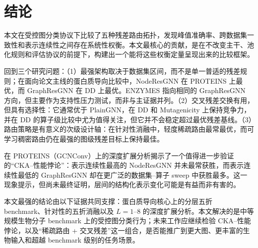 \section{结论}
\label{sec:conclusion}

本文在受控图分类协议下比较了五种残差路由拓扑，发现峰值准确率、跨数据集一致性和表示连续性之间存在系统性权衡。本文最核心的贡献，是在不改变主干、池化规则和评估协议的前提下，构建出一个能将这些权衡定量呈现出来的比较框架。

回到三个研究问题：（1）最强架构取决于数据集区间，而不是单一普适的残差规则；在面向论文主线的蛋白质导向比较中，NodeResGNN 在 PROTEINS 上最优，而 GraphResGNN 在 DD 上最优。ENZYMES 指向相同的 GraphResGNN 方向，但主要作为支持性压力测试，而非与主证据并列。（2）交叉残差交换有用，但具有选择性：它通常优于 PlainGNN，在 DD 和 Mutagenicity 上保持竞争力，并在 DD 的算子级比较中尤为值得关注，但它并不会稳定超过最优残差基线。（3）路由策略是有意义的次级设计轴：在针对性消融中，轻度稀疏路由最常最优，而可学习稠密路由仍在最强的图级残差目标上保持最佳。

在 PROTEINS（GCNConv）上的深度扩展分析揭示了一个值得进一步验证的“CKA--性能悖论”：表示连续性最高的 NodeResGNN 并未最常获胜，而表示连续性最低的 GraphResGNN 却在更广泛的数据集--算子 sweep 中获胜最多。这一现象提示，但尚未最终证明，层间的结构化表示变化可能是有益而非有害的。

本文最强的结论由以下证据共同支撑：蛋白质导向核心上的分层五折 benchmark、针对性的五折消融以及 $L=1$--$8$ 的深度扩展分析。本文解决的是中等规模生物分子 benchmark 上的受控图分类行为；未来工作应继续检验 CKA--性能悖论，以及“稀疏路由 + 交叉残差”这一组合，是否能推广到更大图、更丰富的生物输入和超越 benchmark 级别的任务场景。
